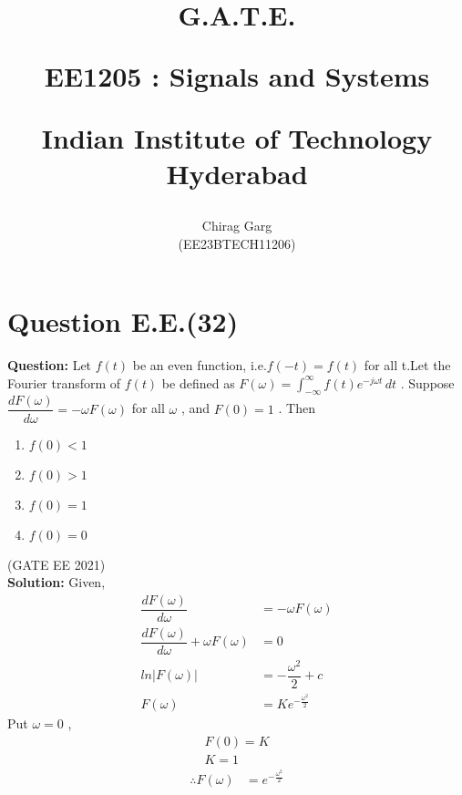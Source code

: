 \documentclass[journal,12pt,twocolumn]{IEEEtran}
\theoremstyle{remark}
\begin{document}
%






\title{
G.A.T.E.

\large{EE1205 : Signals and Systems}

Indian Institute of Technology Hyderabad
}
\author{Chirag Garg

(EE23BTECH11206)
}	





\maketitle

\newpage



\bigskip

\renewcommand{\thefigure}{\theenumi}
\renewcommand{\thetable}{\theenumi}


\section{Question E.E.(32)}
\vspace{0.5cm}



\textbf{Question:} 
Let $f(t)$ be an even function, i.e.$f(-t) = f(t)$ for all t.Let the Fourier transform of $f(t)$ be defined as $F(\omega) = \int_{-\infty}^{\infty} f(t) e^{-j \omega t} \, dt $ . Suppose $\dfrac{dF(\omega)}{d \omega} = -\omega F(\omega)$ for all $\omega$ , and $F(0) = 1$ . Then


\begin{enumerate}[label = (\Alph*)]
\item $f(0) < 1 $\\
\item  $f(0) > 1 $\\
\item  $f(0) = 1 $\\
\item   $f(0) = 0 $\\
\end{enumerate} \hfill{(GATE EE 2021)}\\
\textbf{Solution: }
Given, \begin{align}
\dfrac{dF(\omega)}{d \omega} &= -\omega F(\omega) \\
\dfrac{dF(\omega)}{d \omega} + \omega F(\omega) &= 0 \\
ln|F(\omega)| &= -\dfrac{\omega^{2}}{2} + c \\
F(\omega) &= Ke^{-\frac{\omega^2}{2}}
\end{align}
Put $\omega = 0$ , \begin{align}
F(0) = K \\
K=1
\end{align}
\begin{align}
\therefore F(\omega) &= e^{-\frac{\omega^2}{2}}
\end{align}
\end{document}
